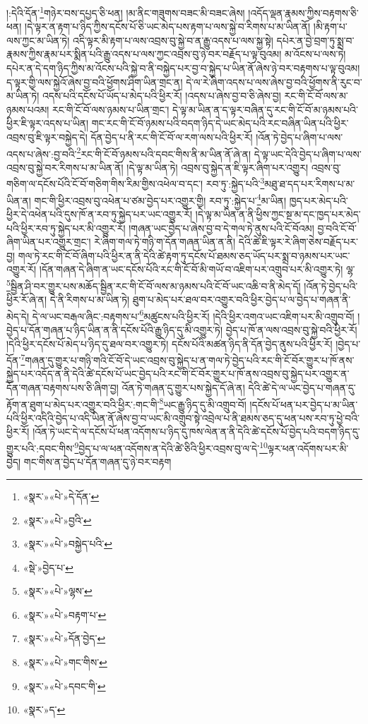 །:དེའི་དོན་\footnote{«སྣར་»«པེ་»དེ་དོན་}གཉེར་བས་དཔྱད་ཅི་ཕན། །མ་ནིང་གཟུགས་བཟང་མི་བཟང་ཞེས། །འདོད་ལྡན་རྣམས་ཀྱིས་བརྟགས་ཅི་ཕན། །དེ་ལྟར་ན་རྟག་པ་ཉིད་ཀྱིས་དངོས་པོ་ཅི་ཡང་མེད་པས་རྟག་པ་ལས་སྐྱེ་བ་རིགས་པ་མ་ཡིན་ནོ། །མི་རྟག་པ་ལས་ཀྱང་མ་ཡིན་ཏེ། འདི་ལྟར་མི་རྟག་པ་ལས་འབྲས་བུ་སྐྱེ་བ་ན་རྒྱུ་འདས་པ་ལས་སྐྱ་སྟེ། དཔེར་ན་བྱེ་བྲག་ཏུ་སྨྲ་བ་རྣམས་ཀྱིས་རྣམ་པར་སྨིན་པའི་རྒྱུ་འདས་པ་ལས་ཀྱང་འབྲས་བུ་ཉེ་བར་བརྗོད་པ་ལྟ་བུའམ། མ་འོངས་པ་ལས་ཏེ། དཔེར་ན་དེ་དག་ཉིད་ཀྱིས་མ་འོངས་པའི་སྐྱེ་བ་ནི་བསྐྱེད་པར་བྱ་བ་སྐྱེད་པ་ཡིན་ནོ་ཞེས་ཉེ་བར་བརྟགས་པ་ལྟ་བུའམ། ད་ལྟར་གྱི་ལས་སྐྱེའོ་ཞེས་བྱ་བའི་ཕྱོགས་ཤིག་ཡིན་གྲང་ན། དེ་ལ་རེ་ཞིག་འདས་པ་ལས་ཞེས་བྱ་བའི་ཕྱོགས་ནི་རུང་བ་མ་ཡིན་ཏེ། འདས་པའི་དངོས་པོ་ཡོད་པ་མེད་པའི་ཕྱིར་རོ། །འདས་པ་ཞེས་བྱ་བ་ཅི་ཞེས་བྱ། རང་གི་ངོ་བོ་ལས་མ་ཉམས་པའམ། རང་གི་ངོ་བོ་ལས་ཉམས་པ་ཡིན་གྲང་། དེ་ལྟ་མ་ཡིན་ན་ད་ལྟར་བཞིན་དུ་རང་གི་ངོ་བོ་མ་ཉམས་པའི་ཕྱིར་ཇི་ལྟར་འདས་པ་ཡིན། གང་རང་གི་ངོ་བོ་ཉམས་པའི་བདག་ཉིད་དེ་ཡང་མེད་པའི་རང་བཞིན་ཡིན་པའི་ཕྱིར་འབྲས་བུ་ཇི་ལྟར་བསྐྱེད་དེ། དོན་བྱེད་པ་ནི་རང་གི་ངོ་བོ་ལ་རག་ལས་པའི་ཕྱིར་རོ། །འོན་ཏེ་བྱེད་པ་ཞིག་པ་ལས་འདས་པ་ཞེས་:བྱ་བའི་\footnote{«སྣར་»«པེ་»བྱའི་}རང་གི་ངོ་བོ་ཉམས་པའི་དབང་གིས་ནི་མ་ཡིན་ནོ་ཞེ་ན། དེ་ལྟ་ཡང་དེའི་བྱེད་པ་ཞིག་པ་ལས་འབྲས་བུ་སྐྱེ་བར་རིགས་པ་མ་ཡིན་ནོ། །དེ་ལྟ་མ་ཡིན་ཏེ། འབྲས་བུ་སྐྱེད་ན་ཇི་ལྟར་ཞིག་པར་འགྱུར། འབྲས་བུ་གཅིག་ལ་དངོས་པོའི་ངོ་བོ་གཅིག་གིས་རིམ་གྱིས་འཕེལ་བ་དང་། རབ་ཏུ་:སྐྱེད་པའི་\footnote{«སྣར་»«པེ་»བསྐྱེད་པའི་}མཐུ་ཐ་དད་པར་རིགས་པ་མ་ཡིན་ན། གང་གི་ཕྱིར་འབྲས་བུ་འཕེན་པ་ཙམ་བྱེད་པར་འགྱུར་གྱི། རབ་ཏུ་:སྐྱེད་པ་\footnote{«སྡེ་»བྱེད་པ་}མ་ཡིན། ཁྱད་པར་མེད་པའི་ཕྱིར་དེ་འཕེན་པའི་དུས་ཁོ་ན་རབ་ཏུ་སྐྱེད་པར་ཡང་འགྱུར་རོ། །དེ་ལྟ་མ་ཡིན་ན་ནི་ཕྱིས་ཀྱང་སྔ་མ་དང་ཁྱད་པར་མེད་པའི་ཕྱིར་རབ་ཏུ་སྐྱེད་པར་མི་འགྱུར་རོ། །གཞན་ཡང་བྱེད་པ་ཞེས་བྱ་བ་དེ་གལ་ཏེ་ནུས་པའི་ངོ་བོའམ། བྱ་བའི་ངོ་བོ་ཞིག་ཡིན་པར་འགྱུར་གྲང་། རེ་ཞིག་གལ་ཏེ་གཉི་ག་དོན་གཞན་ཡིན་ན་ནི། དེའི་ཚེ་ཇི་ལྟར་རེ་ཞིག་ཅེས་བརྗོད་པར་བྱ། གལ་ཏེ་རང་གི་ངོ་བོ་ཞིག་པའི་ཕྱིར་ན་ནི་དེའི་ཚེ་རྟག་ཏུ་དངོས་པོ་ཐམས་ཅད་ཡོད་པར་སྨྲ་བ་ཉམས་པར་ཡང་འགྱུར་རོ། །དོན་གཞན་དེ་ཞིག་ན་ཡང་དངོས་པོའི་རང་གི་ངོ་བོ་མི་གཡོ་བ་འཇིག་པར་འགྲུབ་པར་མི་འགྱུར་ཏེ། ལྷ་\footnote{«སྣར་»«པེ་»ལྷས་}སྦྱིན་ཤི་བར་གྱུར་པས་མཆོད་སྦྱིན་རང་གི་ངོ་བོ་ལས་མ་ཉམས་པའི་ངོ་བོ་ཡང་འཆི་བ་ནི་མེད་དོ། །འོན་ཏེ་བྱེད་པའི་ཕྱིར་རོ་ཞེ་ན། དེ་ནི་རིགས་པ་མ་ཡིན་ཏེ། ཐུག་པ་མེད་པར་ཐལ་བར་འགྱུར་བའི་ཕྱིར་བྱེད་པ་ལ་བྱེད་པ་གཞན་ནི་མེད་དེ། དེ་ལ་ཡང་བརྒལ་ཞིང་:བརྟགས་པ་\footnote{«སྣར་»«པེ་»བརྟག་པ་}མཚུངས་པའི་ཕྱིར་རོ། །དེའི་ཕྱིར་འགའ་ཡང་འཇིག་པར་མི་འགྲུབ་བོ། །བྱེད་པ་དོན་གཞན་པ་ཉིད་ཡིན་ན་ནི་དངོས་པོའི་རྒྱུ་ཉིད་དུ་མི་འགྱུར་ཏེ། བྱེད་པ་ཁོ་ན་ལས་འབྲས་བུ་སྐྱེ་བའི་ཕྱིར་རོ། །དེའི་ཕྱིར་དངོས་པོ་མེད་པ་ཉིད་དུ་ཐལ་བར་འགྱུར་ཏེ། དངོས་པོའི་མཚན་ཉིད་ནི་དོན་བྱེད་ནུས་པའི་ཕྱིར་རོ། །བྱེད་པ་དོན་\footnote{«སྣར་»«པེ་»དོན་བྱེད་}གཞན་དུ་གྱུར་པ་གཉི་གའི་ངོ་བོ་དེ་ཡང་འབྲས་བུ་སྐྱེད་པ་ན་གལ་ཏེ་བྱེད་པའི་རང་གི་ངོ་བོར་གྱུར་པ་ཁོ་ནས་སྐྱེད་པར་འདོད་ན་ནི་དེའི་ཚེ་དངོས་པོ་ཡང་བྱེད་པའི་རང་གི་ངོ་བོར་གྱུར་པ་ཁོ་ནས་འབྲས་བུ་སྐྱེད་པར་འགྱུར་ན་དོན་གཞན་བརྟགས་པས་ཅི་ཞིག་བྱ། འོན་ཏེ་གཞན་དུ་གྱུར་པས་སྐྱེད་དོ་ཞེ་ན། དེའི་ཚེ་དེ་ལ་ཡང་བྱེད་པ་གཞན་དུ་རྟོག་ན་ཐུག་པ་མེད་པར་འགྱུར་བའི་ཕྱིར་:གང་གི་\footnote{«སྣར་»«པེ་»གང་གིས་}ཡང་རྒྱུ་ཉིད་དུ་མི་འགྲུབ་བོ། །དངོས་པོ་ཕན་པར་བྱེད་པ་མ་ཡིན་པའི་ཕྱིར་འདིའི་བྱེད་པ་འདི་ཡིན་ནོ་ཞེས་བྱ་བ་ཡང་མི་འགྲུབ་སྟེ་འབྲེལ་པ་ནི་ཐམས་ཅད་དུ་ཕན་པས་རབ་ཏུ་ཕྱེ་བའི་ཕྱིར་རོ། །འོན་ཏེ་ཡང་དེ་ལ་དངོས་པོ་ཕན་འདོགས་པ་ཉིད་དུ་ཁས་ལེན་ན་ནི་དེའི་ཚེ་དངོས་པོ་བྱེད་པའི་བདག་ཉིད་དུ་གྱུར་པའི་:དབང་གིས་\footnote{«སྣར་»«པེ་»དབང་གི་}བྱེད་པ་ལ་ཕན་འདོགས་ན་དེའི་ཚེ་ཅིའི་ཕྱིར་འབྲས་བུ་ལ་དེ་\footnote{«སྣར་»ད་}ལྟར་ཕན་འདོགས་པར་མི་བྱེད། གང་གིས་ན་བྱེད་པ་དོན་གཞན་དུ་ཉེ་བར་བརྟག 